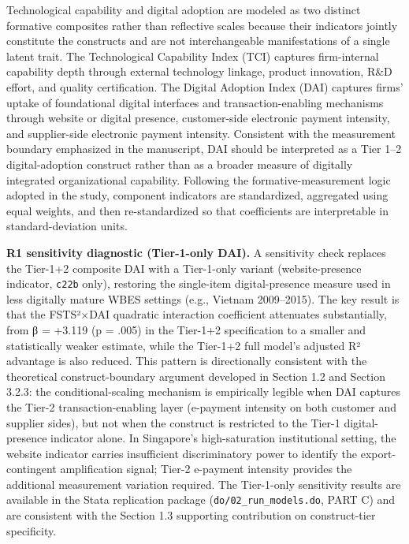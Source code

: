 \documentclass[
  12pt,a4paper]{article}
\begin{document}
Technological capability and digital adoption are modeled as two
distinct formative composites rather than reflective scales because
their indicators jointly constitute the constructs and are not
interchangeable manifestations of a single latent trait. The
Technological Capability Index (TCI) captures firm-internal capability
depth through external technology linkage, product innovation, R\&D
effort, and quality certification. The Digital Adoption Index (DAI)
captures firms' uptake of foundational digital interfaces and
transaction-enabling mechanisms through website or digital presence,
customer-side electronic payment intensity, and supplier-side electronic
payment intensity. Consistent with the measurement boundary emphasized
in the manuscript, DAI should be interpreted as a Tier 1--2
digital-adoption construct rather than as a broader measure of digitally
integrated organizational capability. Following the
formative-measurement logic adopted in the study, component indicators
are standardized, aggregated using equal weights, and then
re-standardized so that coefficients are interpretable in
standard-deviation units.

\textbf{R1 sensitivity diagnostic (Tier-1-only DAI).} A sensitivity
check replaces the Tier-1+2 composite DAI with a Tier-1-only variant
(website-presence indicator, \texttt{c22b} only), restoring the
single-item digital-presence measure used in less digitally mature WBES
settings (e.g., Vietnam 2009--2015). The key result is that the
FSTS²×DAI quadratic interaction coefficient attenuates substantially,
from β = +3.119 (p = .005) in the Tier-1+2 specification to a smaller
and statistically weaker estimate, while the Tier-1+2 full model's
adjusted R² advantage is also reduced. This pattern is directionally
consistent with the theoretical construct-boundary argument developed in
Section 1.2 and Section 3.2.3: the conditional-scaling mechanism is
empirically legible when DAI captures the Tier-2 transaction-enabling
layer (e-payment intensity on both customer and supplier sides), but not
when the construct is restricted to the Tier-1 digital-presence
indicator alone. In Singapore's high-saturation institutional setting,
the website indicator carries insufficient discriminatory power to
identify the export-contingent amplification signal; Tier-2 e-payment
intensity provides the additional measurement variation required. The
Tier-1-only sensitivity results are available in the Stata replication
package (\texttt{do/02\_run\_models.do}, PART C) and are consistent with
the Section 1.3 supporting contribution on construct-tier specificity.
\end{document}
